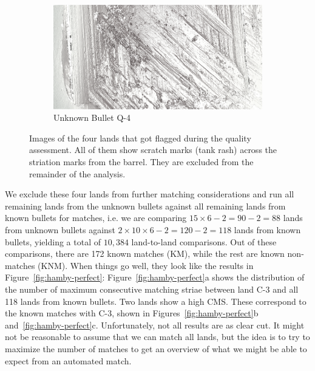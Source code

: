 \documentclass[aoas, preprint]{imsart}\usepackage[]{graphicx}\usepackage[]{color}
\begin{document}
\begin{figure}
\begin{subfigure}[t]{.49\textwidth}
\end{subfigure}
\begin{subfigure}[t]{.49\textwidth}\centering
\caption{Unknown Bullet Q-4}
\includegraphics[width=\textwidth]{q-4-grey.png}
\end{subfigure}
\caption{\label{fig:fourflags}Images of the four lands that got flagged during the quality assessment. All of them show scratch marks (tank rash) across the striation marks from the barrel. They are excluded from the remainder of the analysis.}
\end{figure}
%
We exclude these four lands from further matching considerations and
 run all remaining lands from the unknown bullets against all remaining lands from known bullets for matches, i.e. we are comparing $15 \times 6 -2 = 90 - 2 = 88$ lands from unknown bullets against $2 \times 10 \times 6 -2 = 120 - 2 = 118$ lands from known bullets, yielding a total of $10,384$ land-to-land comparisons. Out of these comparisons, there are 172 known matches (KM), while the rest are known non-matches (KNM). 
 When things go well, they look like the results in Figure~\ref{fig:hamby-perfect}: Figure~\ref{fig:hamby-perfect}a shows the distribution of the number of maximum consecutive matching striae between land C-3 and all 118 lands from known bullets. Two lands show a high CMS. These correspond to the known matches with C-3, shown in Figures~\ref{fig:hamby-perfect}b and~\ref{fig:hamby-perfect}c. 
 Unfortunately, not all results are as clear cut. 
It might not be reasonable to assume that we can match all lands, but the idea is to try to maximize the number of matches to get an overview of what we might be able to expect from an automated match. 
\end{document}
